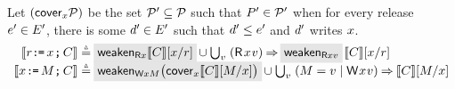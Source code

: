\begin{definition}
  Let $(\relfilt[]{\aLoc} \aPSS)$ be the set $\mathcal{P}'\subseteq\mathcal{P}$ such that
  $P'\in\mathcal{P}'$ when for every release $e'\in E'$, there is some
  $d'\in E'$ such that $d' \le e'$ and $d'$ \externally writes
  $x$.
  \begin{align*}
    \sem{\aReg\GETS\aLoc^\modeRLXquiet\SEMI \aCmd} &\eqdef
    \;\mathhl{\Rdis{\aLoc}{}\sem{\aCmd}[\aLoc/\aReg]}\;
    \cup
    \textstyle\bigcup_\aVal\;
    (\DR[\modeRLXquiet]\aLoc\aVal) \prefix \;\mathhl{\Rdis{\aLoc}{\aVal}}\;\,\sem{\aCmd} [\aLoc/\aReg]
    \\
    \sem{\aLoc^\modeRLXquiet\GETS\aExp\SEMI \aCmd} & \eqdef
    \;\mathhl{\Wdis{\aLoc}{\aExp}\bigl(\relfilt[]{\aLoc} \sem{\aCmd}[\aExp/\aLoc]\bigr)}\;
    \cup
    \textstyle\bigcup_\aVal\; (\aExp=\aVal \mid \DW[\modeRLXquiet]\aLoc\aVal) \prefix \sem{\aCmd}[\aExp/\aLoc]
  \end{align*}
\end{definition}
